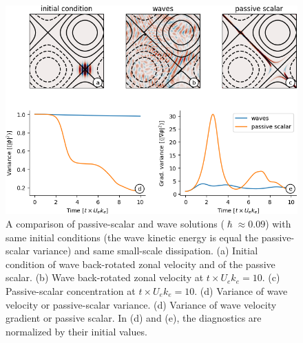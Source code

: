 \documentclass{jfm}
\begin{document}
\begin{figure}
\centering
\includegraphics[width=1.\textwidth]{figs/figesc.png}
\caption{A comparison of passive-scalar and wave solutions ($\hslash \approx 0.09$)
          with
          same initial conditions (the wave kinetic energy is equal
          the passive-scalar variance) and same small-scale dissipation.
          (a) Initial condition of wave back-rotated zonal velocity and  of the passive scalar.
          (b) Wave back-rotated zonal velocity at $t\times U_e k_e = 10$. (c)
          Passive-scalar concentration at $t\times U_e k_e = 10$. (d) Variance
          of wave velocity or passive-scalar variance. (d) Variance of wave velocity gradient or
          passive scalar. In (d) and (e),
          the diagnostics are normalized by their initial values.
        } \label{wave_escaping}
\end{figure}
\end{document}
